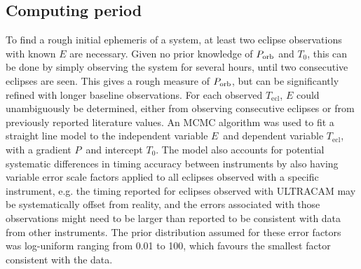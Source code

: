 \subsection{Computing period}
\label{sect:modelling:Computing ephemeris}

To find a rough initial ephemeris of a system, at least two eclipse observations with known $E$ are necessary. Given no prior knowledge of $P_{\rm orb}$ and $T_0$, this can be done by simply observing the system for several hours, until two consecutive eclipses are seen. This gives a rough measure of $P_{\rm orb}$, but can be significantly refined with longer baseline observations. 
For each observed $T_\mathrm{ecl}$, $E$ could unambiguously be determined, either from observing consecutive eclipses or from previously reported literature values.
An MCMC algorithm was used to fit a straight line model to the independent variable $E$\ and dependent variable $T_\mathrm{ecl}$, with a gradient $P$\ and intercept $T_0$. 
The model also accounts for potential systematic differences in timing accuracy between instruments by also having variable error scale factors applied to all eclipses observed with a specific instrument, e.g. the timing reported for eclipses observed with ULTRACAM may be systematically offset from reality, and the errors associated with those observations might need to be larger than reported to be consistent with data from other instruments. The prior distribution assumed for these error factors was log-uniform ranging from 0.01 to 100, which favours the smallest factor consistent with the data. 

